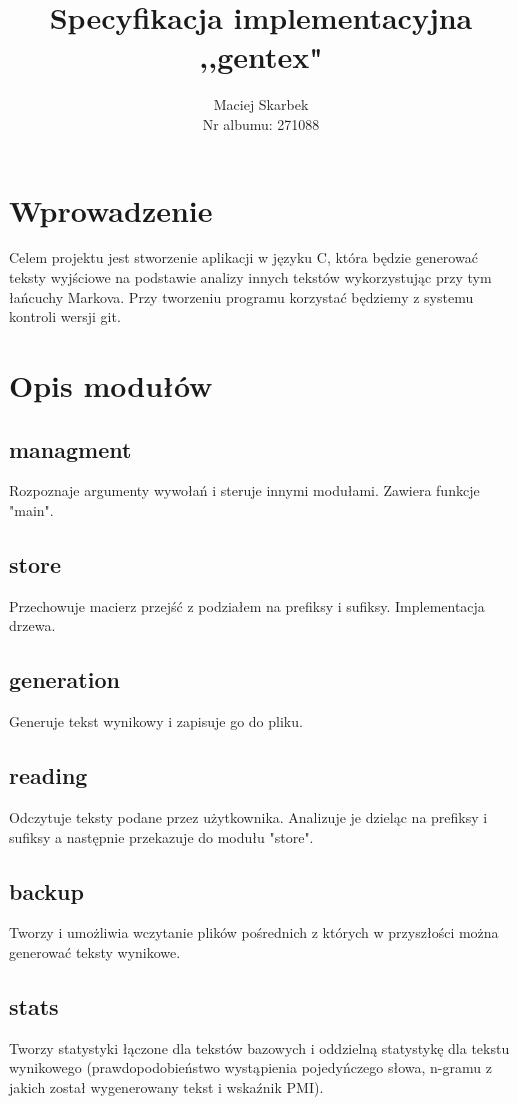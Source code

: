 \documentclass[12pt,a4paper]{report}
\author{Maciej Skarbek \\Nr albumu: 271088}
\title{{\Huge \textbf{Specyfikacja implementacyjna \\,,gentex"}}}
\begin{document}
\maketitle

\section*{Wprowadzenie} Celem projektu jest stworzenie aplikacji w języku C, która będzie generować teksty wyjściowe na podstawie analizy innych tekstów wykorzystując przy tym łańcuchy Markova. Przy tworzeniu programu korzystać będziemy z systemu kontroli wersji git.

\section*{Opis modułów}

	\subsection*{managment} Rozpoznaje argumenty wywołań i steruje innymi modułami. Zawiera funkcje "main".
	
	\subsection*{store} Przechowuje macierz przejść z podziałem na prefiksy i sufiksy. Implementacja drzewa.
	
	\subsection*{generation} Generuje tekst wynikowy i zapisuje go do pliku.
	
	\subsection*{reading} Odczytuje teksty podane przez użytkownika. Analizuje je dzieląc na prefiksy i sufiksy a następnie przekazuje do modułu "store".
	
	\subsection*{backup} Tworzy i umożliwia wczytanie plików pośrednich z których w przyszłości można generować teksty wynikowe.
	
	\subsection*{stats} Tworzy statystyki łączone dla tekstów bazowych i oddzielną statystykę dla tekstu wynikowego (prawdopodobieństwo wystąpienia pojedyńczego słowa, n-gramu z jakich został wygenerowany tekst i wskaźnik PMI).
	
\end{document}
